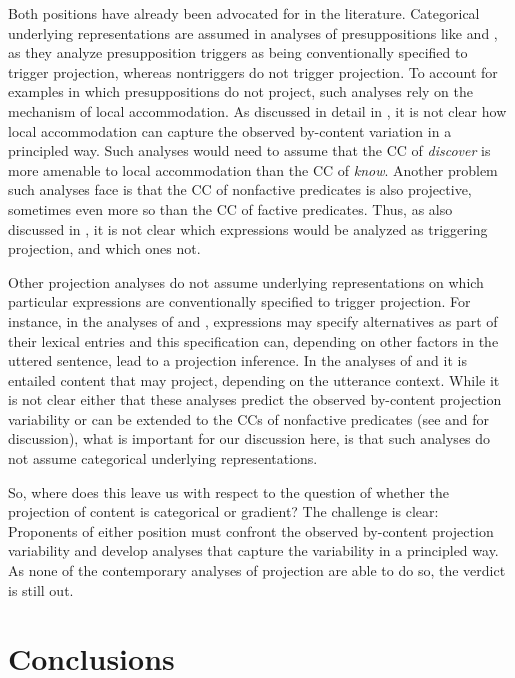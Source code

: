 \documentclass[11pt,fleqn]{article}
\newcommand{\6}{\mbox{$[\hspace*{-.6mm}[$}}
\newcommand{\9}{\mbox{$]\hspace*{-.6mm}]$}}
\begin{document}
Both positions have already been advocated for in the literature. Categorical underlying representations are assumed in analyses of presuppositions like \citealt{heim83} and \citealt{vds92}, as they analyze presupposition triggers as being conventionally specified to trigger projection, whereas nontriggers do not trigger projection. To account for examples in which presuppositions do not project, such analyses rely on the mechanism of local accommodation. As discussed in detail in \citealt{tbd-variability}, it is not clear how local accommodation can capture the observed by-content variation in a principled way. Such analyses would need to assume that the CC of {\em discover} is more amenable to local accommodation than the CC of {\em know}. Another problem such analyses face is that the CC of nonfactive predicates is also projective, sometimes even more so than the CC of factive predicates. Thus, as also discussed in \citealt{degen-tonhauser-language}, it is not clear which expressions would be analyzed as triggering projection, and which ones not.

Other projection analyses do not assume underlying representations on which particular expressions are conventionally specified to trigger projection. For instance, in the analyses of \citealt{abusch02,abusch10} and \citealt{romoli2015}, expressions may specify alternatives as part of their lexical entries and this specification can, depending on other factors in the uttered sentence, lead to a projection inference. In the analyses of  \citealt{abrusan2011,abrusan2016} and \citealt{brst-salt10,simons-etal2017} it is entailed content that may project, depending on the utterance context. While it is not clear either that these analyses predict the observed by-content projection variability or can be extended to the CCs of nonfactive predicates (see \citealt{tbd-variability} and \citealt{degen-tonhauser-language} for discussion), what is important for our discussion here, is that such analyses do not assume categorical underlying representations.

So, where does this leave us with respect to the question of whether the projection of content is categorical or gradient? The challenge is clear: Proponents of either position must confront the observed by-content projection variability and develop analyses that capture the variability in a principled way. As none of the contemporary analyses of projection are able to do so, the verdict is still out.

\section{Conclusions}\label{s4}
\end{document}

